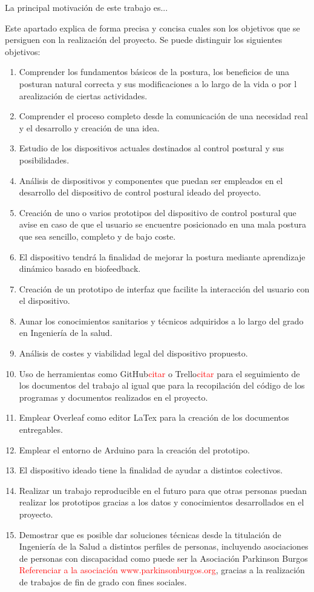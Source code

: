 
La principal motivación de este trabajo es...

Este apartado explica de forma precisa y concisa cuales son los objetivos que se persiguen con la realización del proyecto. Se puede distinguir los siguientes objetivos:

\begin{enumerate}
    \item Comprender los fundamentos básicos de la postura, los beneficios de una posturan natural correcta y sus modificaciones a lo largo de la vida o por l arealización de ciertas actividades.
    \item Comprender el proceso completo desde la comunicación de una necesidad real y el desarrollo y creación de una idea.
    \item Estudio de los dispositivos actuales destinados al control postural y sus posibilidades.
    \item Análisis de dispositivos y componentes que puedan ser empleados en el desarrollo del dispositivo de control postural ideado del proyecto.
    \item Creación de uno o varios prototipos del dispositivo de control postural que avise en caso de que el usuario se encuentre posicionado en una mala postura que sea sencillo, completo y de bajo coste.
    \item El dispositivo tendrá la finalidad de mejorar la postura mediante aprendizaje dinámico basado en biofeedback.
    \item Creación de un prototipo de interfaz que facilite la interacción del usuario con el dispositivo.
    \item Aunar los conocimientos sanitarios y técnicos adquiridos a lo largo del grado en Ingeniería de la salud.
    \item Análisis de costes y viabilidad legal del dispositivo propuesto.
    \item Uso de herramientas como GitHub\textcolor{red}{citar} o Trello\textcolor{red}{citar} para el seguimiento de los documentos del trabajo al igual que para la recopilación del código de los programas y documentos realizados en el proyecto.
    \item Emplear Overleaf como editor LaTex para la creación de los documentos entregables.
    \item Emplear el entorno de Arduino para la creación del prototipo.
    \item El dispositivo ideado tiene la finalidad de ayudar a distintos colectivos.
    \item Realizar un trabajo reproducible en el futuro para que otras personas puedan realizar los prototipos gracias a los datos y conocimientos desarrollados en el proyecto.
    \item Demostrar que es posible dar soluciones técnicas desde la titulación de Ingeniería de la Salud a distintos perfiles de personas, incluyendo asociaciones de personas con discapacidad como puede ser la Asociación Parkinson Burgos \textcolor{red}{Referenciar a la asociación www.parkinsonburgos.org}, gracias a la realización de trabajos de fin de grado con fines sociales.
\end{enumerate}









